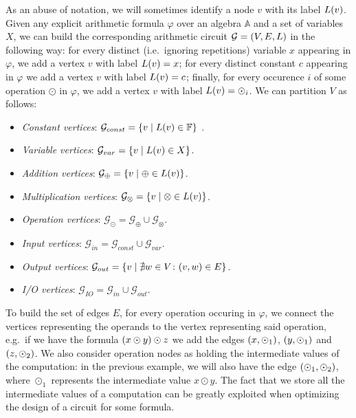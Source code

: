As an abuse of notation, we will sometimes identify a node \(v\) with its label \(\call{L}{v}\).
Given any explicit arithmetic formula \(\varphi \) over an algebra \(\mathbb{A}\) and a set of 
variables \(X\), we can build the corresponding arithmetic circuit \(\mathcal{G} = \Tuple{V, E, L}\) 
in the following way: for every distinct (i.e.\ ignoring repetitions) variable \(x\) appearing 
in \(\varphi \), we add a vertex \(v\) with label \(\call{L}{v} = x\); 
for every distinct constant \(c\) appearing in \(\varphi \) we add a vertex \(v\) with label 
\(\call{L}{v} = c\); 
finally, for every occurence \(i\) of some operation \(\odot \) in \(\varphi \), we add a vertex
\(v\) with label \(\call{L}{v} = \odot_{i}\).
We can partition \(V\) as follows:
\begin{itemize}
  \item \emph{Constant vertices}: 
    \(\mathcal{G}_{const} = \Set{v \mid \call{L}{v} \in \mathbb{F}}\) .
  \item \emph{Variable vertices}: 
    \(\mathcal{G}_{var} = \Set{v \mid \call{L}{v} \in X}\).
  \item \emph{Addition vertices}: 
    \(\mathcal{G}_{\oplus} = \Set{v \mid \oplus \in \call{L}{v}}\).
  \item \emph{Multiplication vertices}: 
    \(\mathcal{G}_{\otimes} = \Set{v \mid \otimes \in \call{L}{v}}\).
    \item \emph{Operation vertices}:
    \(\mathcal{G}_{\odot} = \mathcal{G}_{\oplus} \cup \mathcal{G}_{\otimes}\).
  \item \emph{Input vertices}: 
    \(\mathcal{G}_{in} = \mathcal{G}_{const} \cup \mathcal{G}_{var}\).
  \item \emph{Output vertices}: 
    \(\mathcal{G}_{out} = \Set{v \mid \nexists w \in V\colon \Tuple{v, w} \in E}\).
  \item \emph{I/O vertices}: \(\mathcal{G}_{IO} = \mathcal{G}_{in} \cup \mathcal{G}_{out}\).
\end{itemize}

To build the set of edges \(E\), for every operation occuring in \(\varphi \), we connect the 
vertices representing the operands to the vertex representing said operation, e.g.\ if we have 
the formula \(\Parens*{x \odot y} \odot z\) we add the edges \(\Tuple{x, \odot_1}\), 
\(\Tuple{y, \odot_1}\) and \(\Tuple{z, \odot_2}\).
We also consider operation nodes as holding the intermediate values of the computation: in the 
previous example, we will also have the edge \(\Tuple{\odot_1, \odot_2}\), where \(\odot_1 \) 
represents the intermediate value \(x \odot y\).
The fact that we store all the intermediate values of a computation can be greatly exploited when
optimizing the design of a circuit for some formula.

